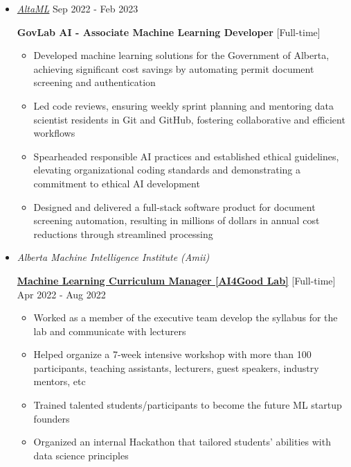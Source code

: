 \documentclass[10pt,letterpaper,sans]{moderncv} %
\begin{document}
	\vspace{0.5cm}
	\begin{itemize}
		\item \href{http://altaml.com/}{ \emph{\large AltaML}} \hfill Sep 2022 - Feb 2023
		\vspace{0.25cm}
		
		\textbf{GovLab AI - Associate Machine Learning Developer} [Full-time]
		
		\begin{itemize}
\item Developed machine learning solutions for the Government of Alberta, achieving significant cost savings by automating permit document screening and authentication

\item Led code reviews, ensuring weekly sprint planning and mentoring data scientist residents in Git and GitHub, fostering collaborative and efficient workflows

\item Spearheaded responsible AI practices and established ethical guidelines, elevating organizational coding standards and demonstrating a commitment to ethical AI development

\item Designed and delivered a full-stack software product for document screening automation, resulting in millions of dollars in annual cost reductions through streamlined processing
		\end{itemize}
		
\vspace{0.5cm}
		\item \href{https://amii.ca/}{} \emph{\large Alberta Machine Intelligence Institute (Amii)}
		\vspace{0.25cm}
		
		\href{http://ai4goodlab.com/}{%
			\textbf{Machine Learning Curriculum Manager [AI4Good Lab]}}  [Full-time] \hfill Apr 2022 - Aug 2022
		
		\begin{itemize}
			\item Worked as a member of the executive team develop the syllabus for the lab and communicate with lecturers
			\item Helped organize a 7-week intensive workshop with more than 100 participants, teaching assistants, lecturers, guest speakers, industry mentors, etc
			\item Trained talented students/participants to become the future ML startup founders
			\item Organized an internal Hackathon that tailored students' abilities with data science principles
		\end{itemize}
		

\end{itemize}
\end{document}
